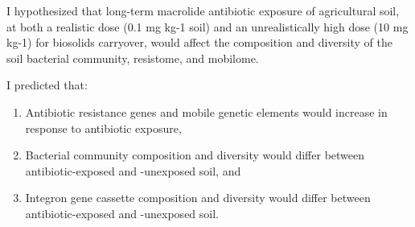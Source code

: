 I hypothesized that long-term macrolide antibiotic exposure of agricultural soil, at both a realistic dose (0.1 mg kg-1 soil) and an unrealistically high dose (10 mg kg-1) for biosolids carryover, would affect the composition and diversity of the soil bacterial community, resistome, and mobilome.

I predicted that:

\begin{enumerate}
  \item{Antibiotic resistance genes and mobile genetic elements would increase in response to antibiotic exposure,}
  \item{Bacterial community composition and diversity would differ between antibiotic-exposed and -unexposed soil, and}
  \item{Integron gene cassette composition and diversity would differ between antibiotic-exposed and -unexposed soil.}
\end{enumerate}
